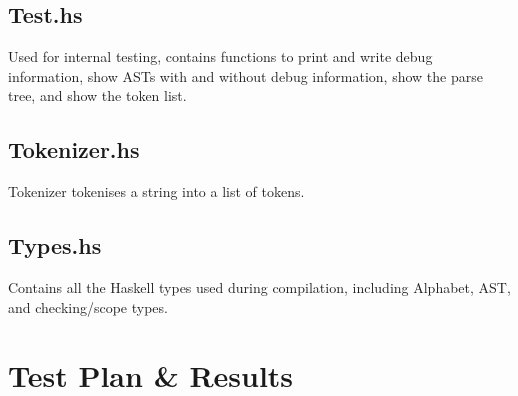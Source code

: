 \documentclass[twoside]{report}
\begin{document}
\section{Test.hs}
Used for internal testing, contains functions to print and write debug information, show ASTs with and without debug information, show the parse tree, and show the token list.

\section{Tokenizer.hs}
Tokenizer tokenises a string into a list of tokens.

\section{Types.hs}
Contains all the Haskell types used during compilation, including Alphabet, AST, and checking/scope types.



\chapter{Test Plan \& Results}
\label{test_plan_and_results}
\end{document}
